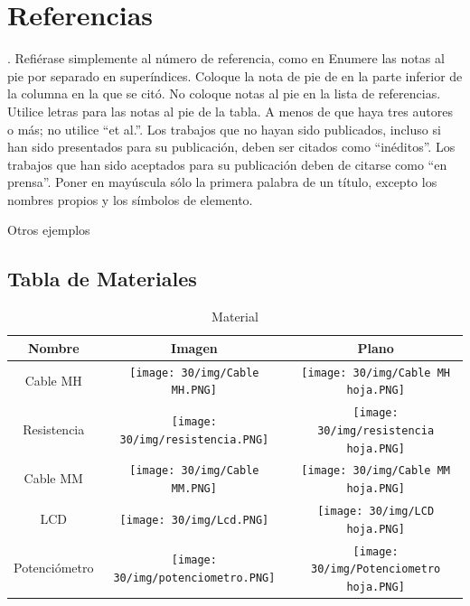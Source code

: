         \section*{Referencias}
    
    
    \cite{andrade2019estudio}.
    \cite{RAE}
    \cite{meyers2000estudios}
    \cite{arteaga2020importancia}
        Refiérase simplemente al número de referencia, como en %
        Enumere las notas al pie por separado en superíndices. Coloque la nota de pie de en la parte inferior de la columna en la que se citó. No coloque notas al pie en la lista de referencias. Utilice letras para las notas al pie de la tabla.
        A menos de que haya tres autores o más; no utilice “et al.”. Los trabajos que no hayan sido publicados, incluso si han sido presentados para su publicación, deben ser citados como “inéditos”. Los trabajos que han sido aceptados para su publicación deben de citarse como “en prensa”. Poner en mayúscula sólo la primera palabra de un título, excepto los nombres propios y los símbolos de elemento. 
    
        Otros ejemplos %
    
    \subsection{Tabla de Materiales}
    \begin{table}[H]
        \centering
        \begin{tabular}{|c|c|c|}
        \hline
        Nombre & Imagen & Plano \\
        \hline
        Cable MH & \texttt{[image: 30/img/Cable MH.PNG]} & \texttt{[image: 30/img/Cable MH hoja.PNG]} \\
        \hline
        Resistencia & \texttt{[image: 30/img/resistencia.PNG]} & \texttt{[image: 30/img/resistencia hoja.PNG]} \\
        \hline
        Cable MM & \texttt{[image: 30/img/Cable MM.PNG]} & \texttt{[image: 30/img/Cable MM hoja.PNG]} \\
        \hline
        LCD & \texttt{[image: 30/img/Lcd.PNG]} & \texttt{[image: 30/img/LCD hoja.PNG]} \\
        \hline
        Potenciómetro & \texttt{[image: 30/img/potenciometro.PNG]} & \texttt{[image: 30/img/Potenciometro hoja.PNG]} \\
        \hline
        \end{tabular}
        \caption{Material}
        \label{tab:my_label}
    \end{table}
    
